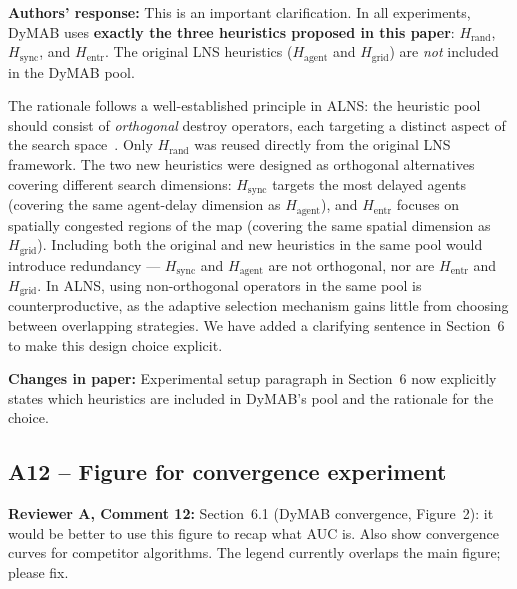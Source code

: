 \documentclass[review]{jair}
\begin{document}
\begin{authorbox}
\textbf{Authors' response:} This is an important clarification. In all experiments, DyMAB uses \textbf{exactly the three heuristics proposed in this paper}: $H_{\text{rand}}$, $H_{\text{sync}}$, and $H_{\text{entr}}$. The original LNS heuristics ($H_{\text{agent}}$ and $H_{\text{grid}}$) are \emph{not} included in the DyMAB pool.

The rationale follows a well-established principle in ALNS: the heuristic pool should consist of \emph{orthogonal} destroy operators, each targeting a distinct aspect of the search space~\citep{LNS2}. Only $H_{\text{rand}}$ was reused directly from the original LNS framework. The two new heuristics were designed as orthogonal alternatives covering different search dimensions: $H_{\text{sync}}$ targets the most delayed agents (covering the same agent-delay dimension as $H_{\text{agent}}$), and $H_{\text{entr}}$ focuses on spatially congested regions of the map (covering the same spatial dimension as $H_{\text{grid}}$). Including both the original and new heuristics in the same pool would introduce redundancy --- $H_{\text{sync}}$ and $H_{\text{agent}}$ are not orthogonal, nor are $H_{\text{entr}}$ and $H_{\text{grid}}$. In ALNS, using non-orthogonal operators in the same pool is counterproductive, as the adaptive selection mechanism gains little from choosing between overlapping strategies. We have added a clarifying sentence in Section~6 to make this design choice explicit.
\end{authorbox}

\begin{changebox}
\textbf{Changes in paper:} Experimental setup paragraph in Section~6 now explicitly states which heuristics are included in DyMAB's pool and the rationale for the choice.
\end{changebox}

\subsection*{A12 -- Figure for convergence experiment}

\begin{reviewerbox}
\textbf{Reviewer A, Comment 12:} Section~6.1 (DyMAB convergence, Figure~2): it would be better to use this figure to recap what AUC is. Also show convergence curves for competitor algorithms. The legend currently overlaps the main figure; please fix.
\end{reviewerbox}
\end{document}
